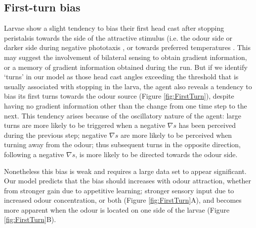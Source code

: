 \documentclass[11pt,a4paper]{article}
\begin{document}
\subsection{First-turn bias}
Larvae show a slight tendency to bias their first head cast after stopping peristalsis towards the side of the attractive stimulus (i.e. the odour side \citep{gomez2011active,gomez2012active} or darker side during negative phototaxis \citep{kane2013sensorimotor}, or towards preferred temperatures \citep{luo2010navigational}. This may suggest the involvement of bilateral sensing to obtain gradient information, or a memory of gradient information obtained during the run. But if we identify ‘turns’ in our model as those head cast angles exceeding the threshold that is usually associated with stopping in the larva, the agent also reveals a tendency to bias its first turns towards the odour source (Figure \ref{fig:FirstTurn}), despite having no gradient information other than the change from one time step to the next. This tendency arises because of the oscillatory nature of the agent: large turns are more likely to be triggered when a negative $\nabla s$ has been perceived during the previous step; negative $\nabla s$ are more likely to be perceived when turning away from the odour; thus subsequent turns in the opposite direction, following a negative $\nabla s$, is more likely to be directed towards the odour side. 

Nonetheless this bias is weak and requires a large data set to appear significant. Our model predicts that the bias should  increases with odour attraction, whether from stronger gain due to appetitive learning; stronger sensory input due to increased odour concentration, or both (Figure \ref{fig:FirstTurn}A), and becomes more apparent when the odour is located on one side of the larvae (Figure \ref{fig:FirstTurn}B).
\end{document}

